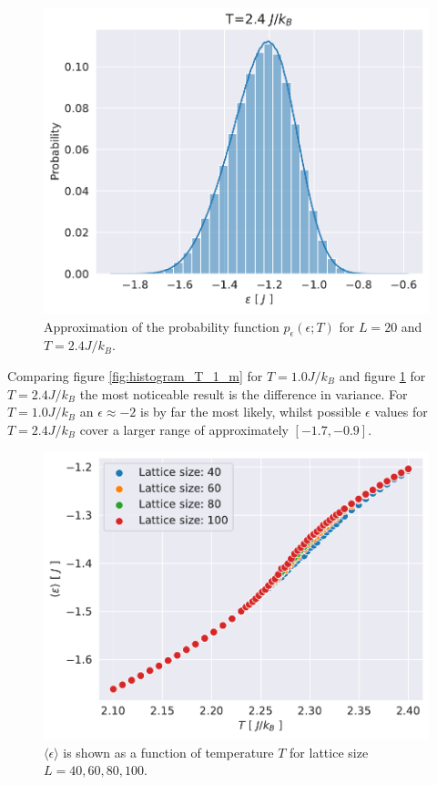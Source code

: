 \documentclass[english,notitlepage,reprint,nofootinbib]{revtex4-1}  %
\begin{document}
\begin{figure}[H]
    \centering
    \includegraphics[width=.5\textwidth]{../figures/histogram_T_2_4_m.pdf}
    \caption{Approximation of the probability function $p_{\epsilon}(\epsilon ; T)$ for $L=20$ and $T=2.4 J/k_B$.}
    \label{fig:histogram_T_2_4_m}
\end{figure}
Comparing figure \ref{fig:histogram_T_1_m} for $T=1.0 J/k_B$ and figure \ref{fig:histogram_T_2_4_m} for $T=2.4 J/k_B$ the most noticeable result is the difference in variance. For $T=1.0 J/k_B$ an $\epsilon \approx -2$ is by far the most likely, whilst possible $\epsilon$ values for $T=2.4 J/k_B$ cover a larger range of approximately $[-1.7,-0.9]$.

\begin{figure}[H]
    \centering
    \includegraphics[width=.5\textwidth]{../figures/L_size_e_T.pdf}
    \caption{$\langle \epsilon \rangle$ is shown as a function of temperature $T$ for lattice size $L= 40, 60,80,100$.}
    \label{fig:L_size_e_T}
\end{figure}
\end{document}
